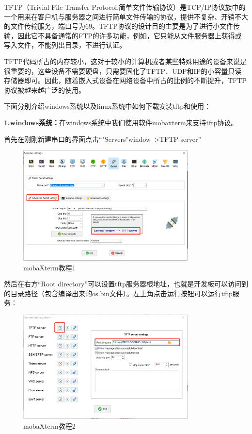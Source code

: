     TFTP（Trivial File Transfer Protocol,简单文件传输协议）是TCP/IP协议族中的一个用来在客户机与服务器之间进行简单文件传输的协议，提供不复杂、开销不大的文件传输服务，端口号为69。TFTP协议的设计目的主要是为了进行小文件传输，因此它不具备通常的FTP的许多功能，例如，它只能从文件服务器上获得或写入文件，不能列出目录，不进行认证。
    
    TFTP代码所占的内存较小，这对于较小的计算机或者某些特殊用途的设备来说是很重要的，这些设备不需要硬盘，只需要固化了TFTP、UDP和IP的小容量只读存储器即可。因此，随着嵌入式设备在网络设备中所占的比例的不断提升，TFTP协议被越来越广泛的使用。
    
    下面分别介绍windows系统以及linux系统中如何下载安装tftp和使用：
    
    \newpage
    
    \textbf{1.windows系统：}在windows系统中我们使用软件mobaxterm来支持tftp协议。
    
    首先在刚刚新建串口的界面点击“"Servers"window-->TFTP server”
    
    \begin{figure}[h]
    	\centering
    	\includegraphics[width=0.8\textwidth]{figures/08-01-mobaXterm教程1.png}
    	\caption{mobaXterm教程1}
    	\label{mobaXterm教程1}
    \end{figure}
    
    然后在右方“Root directory”可以设置tftp服务器根地址，也就是开发板可以访问到的目录路径（包含编译出来的os.bin文件）。左上角点击运行按钮可以运行tftp服务：
    
    \begin{figure}[h]
    	\centering
    	\includegraphics[width=0.8\textwidth]{figures/08-01-mobaXterm教程2.png}
    	\caption{mobaXterm教程2}
    	\label{mobaXterm教程2}
    \end{figure}
    
